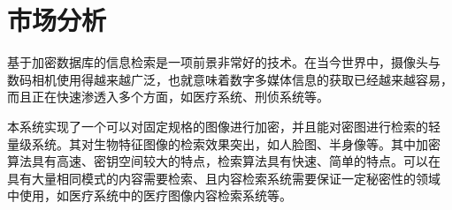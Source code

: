 \section{市场分析}
\label{sec:market-analysis}

基于加密数据库的信息检索是一项前景非常好的技术。在当今世界中，摄像头与
数码相机使用得越来越广泛，也就意味着数字多媒体信息的获取已经越来越容易，
而且正在快速渗透入多个方面，如医疗系统、刑侦系统等。

本系统实现了一个可以对固定规格的图像进行加密，并且能对密图进行检索的轻
量级系统。其对生物特征图像的检索效果突出，如人脸图、半身像等。其中加密
算法具有高速、密钥空间较大的特点，检索算法具有快速、简单的特点。可以在
具有大量相同模式的内容需要检索、且内容检索系统需要保证一定秘密性的领域
中使用，如医疗系统中的医疗图像内容检索系统等。

